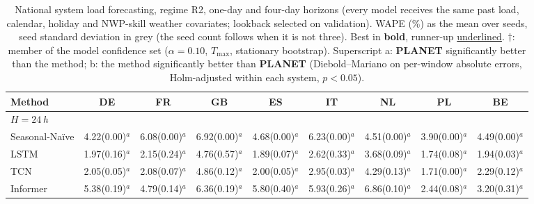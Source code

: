 \begin{table}[!t]
\centering
\caption{National system load forecasting, regime R2, one-day and four-day horizons (every model receives the same past load, calendar, holiday and NWP-skill weather covariates; lookback selected on validation). WAPE (\%) as the mean over seeds, seed standard deviation in grey (the seed count follows when it is not three). Best in \textbf{bold}, runner-up \underline{underlined}. $\dagger$: member of the model confidence set ($\alpha=0.10$, $T_{\max}$, stationary bootstrap). Superscript a: \textbf{PLANET} significantly better than the method; b: the method significantly better than \textbf{PLANET} (Diebold--Mariano on per-window absolute errors, Holm-adjusted within each system, $p<0.05$).}
\label{tab:grids-v2}
\setlength{\tabcolsep}{3pt}\footnotesize
\begin{adjustbox}{max width=\linewidth}
\begin{tabular}{lcccccccc}
\toprule
Method & DE & FR & GB & ES & IT & NL & PL & BE \\
\midrule
\multicolumn{9}{l}{\textit{$H=24$\,h}} \\
Seasonal-Na\"ive & 4.22{\scriptsize\color{gray}(0.00)}$^{a}$ & 6.08{\scriptsize\color{gray}(0.00)}$^{a}$ & 6.92{\scriptsize\color{gray}(0.00)}$^{a}$ & 4.68{\scriptsize\color{gray}(0.00)}$^{a}$ & 6.23{\scriptsize\color{gray}(0.00)}$^{a}$ & 4.51{\scriptsize\color{gray}(0.00)}$^{a}$ & 3.90{\scriptsize\color{gray}(0.00)}$^{a}$ & 4.49{\scriptsize\color{gray}(0.00)}$^{a}$ \\
LSTM & 1.97{\scriptsize\color{gray}(0.16)}$^{a}$ & 2.15{\scriptsize\color{gray}(0.24)}$^{a}$ & 4.76{\scriptsize\color{gray}(0.57)}$^{a}$ & 1.89{\scriptsize\color{gray}(0.07)}$^{a}$ & 2.62{\scriptsize\color{gray}(0.33)}$^{a}$ & 3.68{\scriptsize\color{gray}(0.09)}$^{a}$ & 1.74{\scriptsize\color{gray}(0.08)}$^{a}$ & 1.94{\scriptsize\color{gray}(0.03)}$^{a}$ \\
TCN & 2.05{\scriptsize\color{gray}(0.05)}$^{a}$ & 2.08{\scriptsize\color{gray}(0.07)}$^{a}$ & 4.86{\scriptsize\color{gray}(0.12)}$^{a}$ & 2.00{\scriptsize\color{gray}(0.05)}$^{a}$ & 2.95{\scriptsize\color{gray}(0.03)}$^{a}$ & 4.29{\scriptsize\color{gray}(0.13)}$^{a}$ & 1.71{\scriptsize\color{gray}(0.00)}$^{a}$ & 2.29{\scriptsize\color{gray}(0.12)}$^{a}$ \\
Informer & 5.38{\scriptsize\color{gray}(0.19)}$^{a}$ & 4.79{\scriptsize\color{gray}(0.14)}$^{a}$ & 6.36{\scriptsize\color{gray}(0.19)}$^{a}$ & 5.80{\scriptsize\color{gray}(0.40)}$^{a}$ & 5.93{\scriptsize\color{gray}(0.26)}$^{a}$ & 6.86{\scriptsize\color{gray}(0.10)}$^{a}$ & 2.44{\scriptsize\color{gray}(0.08)}$^{a}$ & 3.20{\scriptsize\color{gray}(0.31)}$^{a}$ \\

\end{tabular}
\end{adjustbox}
\end{table}
